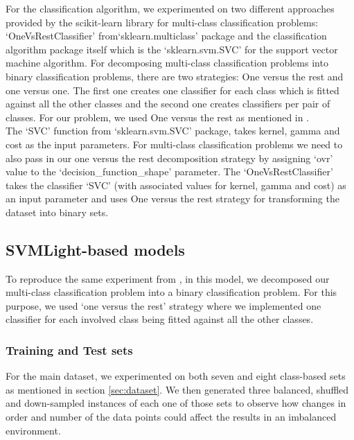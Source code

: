     For the classification algorithm, we experimented on two different approaches provided by the scikit-learn library for  
    multi-class classification problems: `OneVsRestClassifier' from`sklearn.multiclass' package and the classification algorithm 
    package itself which is the `sklearn.svm.SVC' for the support vector machine algorithm. 
    For decomposing multi-class classification problems into 
    binary classification problems, there are two strategies: One versus the rest and one versus one. The first one 
    creates one classifier for each class which is fitted against all the other classes and the second one creates 
    classifiers per pair of classes. For our problem, we used One versus the rest as mentioned in \cite{mishra2014prediction}. \\

    The `SVC' function from `sklearn.svm.SVC' package, takes kernel, gamma and cost as the input parameters. For multi-class 
    classification problems we need to also pass in our one versus the rest decomposition strategy by assigning `ovr' value to 
    the `decision\_function\_shape' parameter. The `OneVsRestClassifier' takes the classifier `SVC' 
    (with associated values for kernel, gamma and cost) as an input parameter 
    and uses One versus the rest strategy for transforming the dataset into binary sets. 


\subsection{SVMLight-based models}
\label{sub:svmmodels}
    To reproduce the same experiment from \cite{mishra2014prediction}, in this model, we decomposed our multi-class 
    classification problem into a binary classification problem. For this purpose, we used `one versus the rest' strategy where 
    we implemented one classifier for each involved class being fitted against all the other classes.\\

    \subsubsection{Training and Test sets}
    For the main dataset, we experimented on both seven and eight class-based sets as mentioned in section \ref{sec:dataset}.
    We then generated three balanced, shuffled and down-sampled instances of each one of those sets
    to observe how changes in order and number of the data points could affect the results in an imbalanced environment.\\

